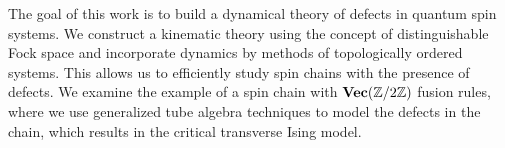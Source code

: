 The goal of this work is to build a dynamical theory of defects in quantum spin systems. We construct a kinematic theory using the concept of distinguishable Fock space and incorporate dynamics by methods of topologically ordered systems. This allows us to efficiently study spin chains with the presence of defects. We examine the example of a spin chain with $\textbf{Vec}(\mathbb{Z}/2\mathbb{Z})$ fusion rules, where we use generalized tube algebra techniques to model the defects in the chain, which results in the critical transverse Ising model.